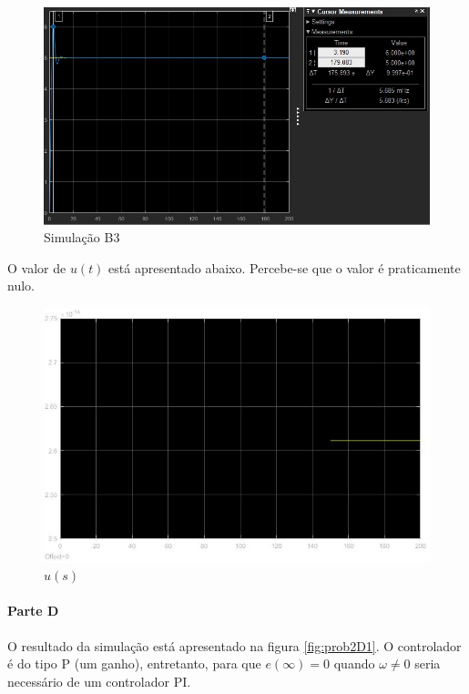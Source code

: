 \documentclass[
]{book}
\theoremstyle{definition}
\theoremstyle{definition}
\theoremstyle{definition}
\theoremstyle{remark}
\begin{document}
\begin{figure}

{\centering \includegraphics[width=0.8\linewidth]{Imagens/Lab5/Resolução/prob2C1} 

}

\caption{Simulação B3}\label{fig:prob2C1}
\end{figure}

O valor de \(u(t)\) está apresentado abaixo. Percebe-se que o valor é praticamente nulo.

\begin{figure}

{\centering \includegraphics[width=0.8\linewidth]{Imagens/Lab5/Resolução/prob2C2} 

}

\caption{$u(s)$}\label{fig:prob2C2}
\end{figure}

\hypertarget{parte-d-3}{%
\paragraph{Parte D}\label{parte-d-3}}

O resultado da simulação está apresentado na figura \ref{fig:prob2D1}. O controlador é do tipo P (um ganho), entretanto, para que \(e(\infty) = 0\) quando \(\omega \neq0\) seria necessário de um controlador PI.
\end{document}
